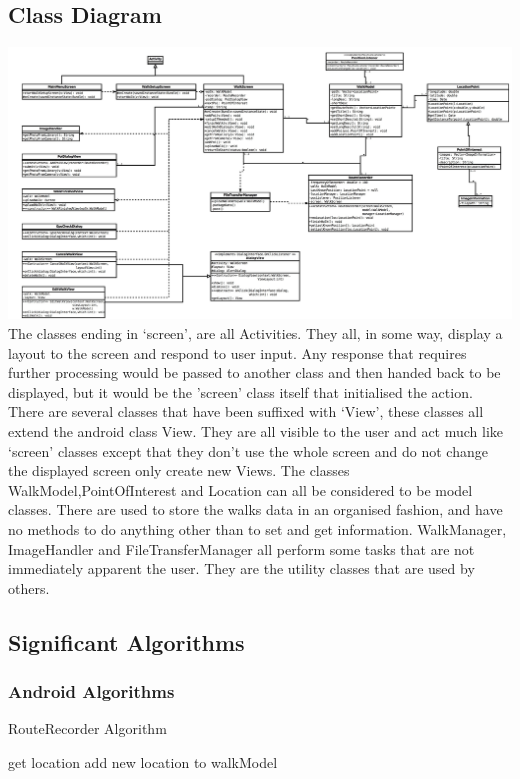 \documentclass[12pt]{article}
\makeatletter
\renewcommand{\paragraph}{
  \@startsection{paragraph}{4}
  {\z@}{3.25ex \@plus -10em \@minus 1em}{0.1em}
  {\normalfont\normalsize\bfseries}
}
\newcommand{\zeroindent}{\setlength{\parindent}{0pt}}
\makeatother
\begin{document}
\subsection{Class Diagram}
\includegraphics[scale=0.60]{Design/class_diagram.jpg}
The classes ending in ‘screen’, are all Activities. They all, in some way, display a layout to the screen and respond to user input. Any response that requires further processing would be passed to another class and then handed back to be displayed, but it would be the ’screen’ class itself that initialised the action.  
There are several classes that have been suffixed with ‘View’, these classes all extend the android class View. They are all visible to the user and act much like ‘screen’ classes except that they don’t use the whole screen and do not change the displayed screen only create new Views.  
The classes WalkModel,PointOfInterest and Location can all be considered to be model classes. There are used to store the walks data in an organised fashion, and have no methods to do anything other than to set and get information.  
WalkManager, ImageHandler and FileTransferManager all perform some tasks that are not immediately apparent the user. They are the utility classes that are used by others.
\subsection{Significant Algorithms}
\subsubsection{Android Algorithms}
\paragraph{RouteRecorder Algorithm}
\zeroindent
\begin{algorithmic}
	\State get location
		\State add new location to walkModel
	\EndIf
\EndWhile
\end{algorithmic}
\end{document}
